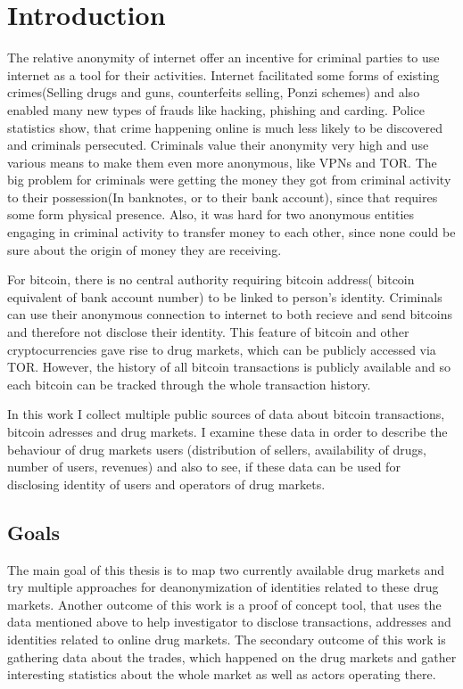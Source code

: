 \documentclass[
  digital, %
  table,   %
  lof,     %
  lot,     %
  oneside
]{fithesis3}
\begin{document}
\chapter{Introduction}

The relative anonymity of internet offer an incentive for criminal parties to use internet as a tool for their activities.
Internet facilitated some forms of existing crimes(Selling drugs and guns, counterfeits selling, Ponzi schemes) and also enabled many new types of frauds like hacking, phishing and carding.
Police statistics show, that crime happening online is much less likely to be discovered and criminals persecuted. Criminals value their anonymity very high and use various means to make them even more anonymous,
like VPNs and TOR. The big problem for criminals were getting the money they got from criminal activity to their possession(In banknotes, or to their bank account), since that requires some form physical presence.
Also, it was hard for two anonymous entities engaging in criminal activity to transfer money to each other, since none could be sure about the origin of money they are receiving.

For bitcoin, there is no central authority requiring bitcoin address( bitcoin equivalent of bank account number) to be linked to person's identity.
Criminals can use their anonymous connection to internet to both recieve and send bitcoins and therefore not disclose their identity.
This feature of bitcoin and other cryptocurrencies gave rise to drug markets, which can be publicly accessed via TOR. However,
the history of all bitcoin transactions is publicly available and so each bitcoin can be tracked through the whole transaction history.

In this work I collect multiple public sources of data about bitcoin transactions, bitcoin adresses and drug markets.
I examine these data in order to describe the behaviour of drug markets users (distribution of sellers, availability of drugs,
number of users, revenues) and also to see, if these data can be used for disclosing identity of users and operators of drug markets.

\section{Goals}

The main goal of this thesis is to map two currently available drug markets 
and try multiple approaches for deanonymization of identities related to these drug markets.
Another outcome of this work is a proof of concept tool, that uses the data mentioned above to help investigator to disclose transactions,
addresses and identities related to online drug markets.
The secondary outcome of this work is gathering data about the trades, which happened on the drug markets and
 gather interesting statistics about the whole market as well as actors operating there.
\end{document}

